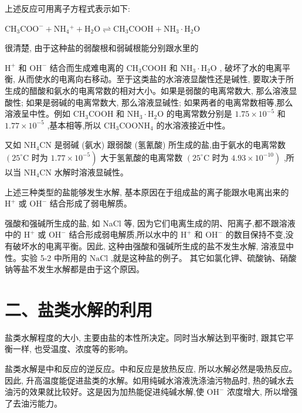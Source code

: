 \documentclass[10pt]{article}
\begin{document}
上述反应可用离子方程式表示如下:

\({\mathrm{{CH}}}_{3}{\mathrm{{COO}}}^{ - } + {\mathrm{{NH}}}_{4}{}^{ + } + {\mathrm{H}}_{2}\mathrm{O} \rightleftharpoons {\mathrm{{CH}}}_{3}\mathrm{{COOH}} + {\mathrm{{NH}}}_{3} \cdot {\mathrm{H}}_{2}\mathrm{O}\)

很清楚, 由于这种盐的弱酸根和弱碱根能分别跟水里的

\({\mathrm{H}}^{ + }\) 和 \({\mathrm{{OH}}}^{ - }\) 结合而生成难电离的 \({\mathrm{{CH}}}_{3}\mathrm{{COOH}}\) 和 \({\mathrm{{NH}}}_{3} \cdot {\mathrm{H}}_{2}\mathrm{O}\) , 破坏了水的电离平衡, 从而使水的电离向右移动。至于这类盐的水溶液显酸性还是碱性, 要取决于所生成的醋酸和氨水的电离常数的相对大小。如果是弱酸的电离常数大, 那么溶液显酸性; 如果是弱碱的电离常数大, 那么溶液显碱性; 如果两者的电离常数相等,那么溶液呈中性。例如 \({\mathrm{{CH}}}_{3}\mathrm{{COOH}}\) 和 \({\mathrm{{NH}}}_{3} \cdot {\mathrm{H}}_{2}\mathrm{O}\) 的电离常数分别是 \({1.75} \times {10}^{-5}\) 和 \({1.77} \times {10}^{-5}\) ,基本相等,所以 \({\mathrm{{CH}}}_{3}{\mathrm{{COONH}}}_{4}\) 的水溶液接近中性。

又如 \({\mathrm{{NH}}}_{4}\mathrm{{CN}}\) 是弱碱 (氨水) 跟弱酸 (氢氰酸) 所生成的盐,由于氨水的电离常数 \(\left( {{25}^{ \circ }\mathrm{C}}\right.\) 时为 \(\left. {{1.77} \times {10}^{-5}}\right)\) 大于氢氰酸的电离常数 \(\left( {{25}^{ \circ }\mathrm{C}}\right.\) 时为 \(\left. {{4.93} \times {10}^{-{10}}}\right)\) ,所以当 \({\mathrm{{NH}}}_{4}\mathrm{{CN}}\) 水解时溶液显碱性。

上述三种类型的盐能够发生水解, 基本原因在于组成盐的离子能跟水电离出来的 \({\mathrm{H}}^{ + }\) 或 \({\mathrm{{OH}}}^{ - }\) 结合形成了弱电解质。

强酸和强碱所生成的盐, 如 NaCl 等, 因为它们电离生成的阴、阳离子,都不跟溶液中的 \({\mathrm{H}}^{ + }\) 或 \({\mathrm{{OH}}}^{ - }\) 结合形成弱电解质,所以水中的 \({\mathrm{H}}^{ + }\) 和 \({\mathrm{{OH}}}^{ - }\) 的数目保持不变,没有破坏水的电离平衡。因此, 这种由强酸和强碱所生成的盐不发生水解, 溶液显中性。实验 5-2 中所用的 \(\mathrm{{NaCl}}\) ,就是这种盐的例子。 其它如氯化钾、硫酸钠、硝酸钠等盐不发生水解都是由于这个原因。

\section*{二、盐类水解的利用}

盐类水解程度的大小, 主要由盐的本性所决定。同时当水解达到平衡时, 跟其它平衡一样, 也受温度、浓度等的影响。

盐类水解是中和反应的逆反应。中和反应是放热反应, 所以水解必然是吸热反应。因此, 升高温度能促进盐类的水解。如用纯碱水溶液洗涤油污物品时, 热的碱水去油污的效果就比较好。这是因为加热能促进纯碱水解,使 \({\mathrm{{OH}}}^{ - }\) 浓度增大, 所以增强了去油污能力。
\end{document}
